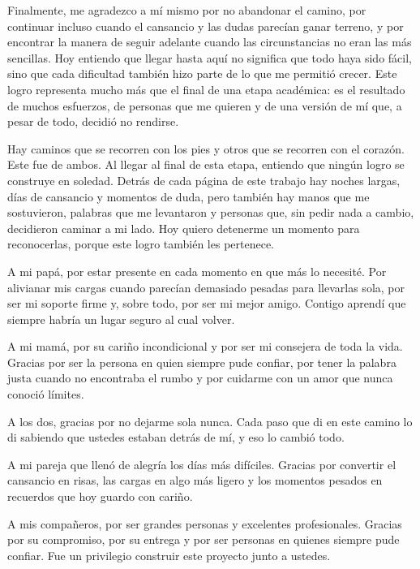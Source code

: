 \documentclass[12pt,letterpaper,oneside]{article}
\newcommand{\autorDos}{Laura Juliana Garzón Arias}
\begin{document}
Finalmente, me agradezco a mí mismo por no abandonar el camino, por continuar incluso cuando el cansancio y las dudas parecían ganar terreno, y por encontrar la manera de seguir adelante cuando las circunstancias no eran las más sencillas. Hoy entiendo que llegar hasta aquí no significa que todo haya sido fácil, sino que cada dificultad también hizo parte de lo que me permitió crecer. Este logro representa mucho más que el final de una etapa académica: es el resultado de muchos esfuerzos, de personas que me quieren y de una versión de mí que, a pesar de todo, decidió no rendirse.

\vspace{1cm}
\noindent{\bfseries \autorDos:}
\vspace{0.3cm}

Hay caminos que se recorren con los pies y otros que se recorren con el corazón. Este fue de ambos. Al llegar al final de esta etapa, entiendo que ningún logro se construye en soledad. Detrás de cada página de este trabajo hay noches largas, días de cansancio y momentos de duda, pero también hay manos que me sostuvieron, palabras que me levantaron y personas que, sin pedir nada a cambio, decidieron caminar a mi lado. Hoy quiero detenerme un momento para reconocerlas, porque este logro también les pertenece.

A mi papá, por estar presente en cada momento en que más lo necesité. Por alivianar mis cargas cuando parecían demasiado pesadas para llevarlas sola, por ser mi soporte firme y, sobre todo, por ser mi mejor amigo. Contigo aprendí que siempre habría un lugar seguro al cual volver.

A mi mamá, por su cariño incondicional y por ser mi consejera de toda la vida. Gracias por ser la persona en quien siempre pude confiar, por tener la palabra justa cuando no encontraba el rumbo y por cuidarme con un amor que nunca conoció límites.

A los dos, gracias por no dejarme sola nunca. Cada paso que di en este camino lo di sabiendo que ustedes estaban detrás de mí, y eso lo cambió todo.

A mi pareja que llenó de alegría los días más difíciles. Gracias por convertir el cansancio en risas, las cargas en algo más ligero y los momentos pesados en recuerdos que hoy guardo con cariño.

A mis compañeros, por ser grandes personas y excelentes profesionales. Gracias por su compromiso, por su entrega y por ser personas en quienes siempre pude confiar. Fue un privilegio construir este proyecto junto a ustedes.
\end{document}
